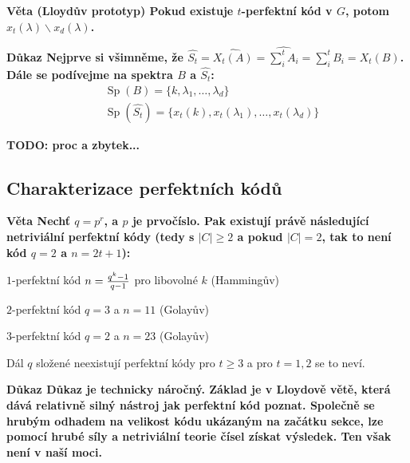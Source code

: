 \documentclass[a4paper,12pt,titlepage]{article}
\newcommand{\dk}{\smallskip\noindent\bf Důkaz\rm{} }
\newcommand{\vt}{\smallskip\noindent\bf Věta\rm{} }
\newcommand{\todo}[1]{\bf TODO: \rm#1}
\DeclareMathOperator{\Sp}{Sp}
\begin{document}
\vt (Lloydův prototyp) Pokud existuje $t$-perfektní kód v $G$, potom $x_t(\lambda)\backslash x_d(\lambda)$.

\dk Nejprve si všimněme, že $\widehat{S_t} = \widehat{X_t(A)} = \widehat{\sum_i^t A_i} = \sum_i^t B_i = X_t(B)$.
Dále se podívejme na spektra $B$ a $\widehat{S_t}$:
\begin{align}
	&\Sp(B) = \{ k, \lambda_1, \ldots, \lambda_d \} \\
	&\Sp(\widehat{S_t}) = \{ x_t(k), x_t(\lambda_1), \ldots, x_t(\lambda_d) \}
\end{align}

\todo{proc a zbytek...}


\subsection{Charakterizace perfektních kódů}

\vt Nechť $q=p^r$, a $p$ je prvočíslo. Pak existují právě následující netriviální perfektní kódy (tedy s $|C| \geq 2$ a pokud $|C| = 2$, tak to není kód $q=2$ a $n=2t+1$):
\begin{description}
	\item $1$-perfektní kód $n={q^k-1 \over q-1}$ pro libovolné $k$ (Hammingův)
	\item $2$-perfektní kód $q=3$ a $n=11$ (Golayův)
	\item $3$-perfektní kód $q=2$ a $n=23$ (Golayův)
\end{description}
Dál $q$ složené neexistují perfektní kódy pro $t \geq 3$ a pro $t = 1,2$ se to neví.

\dk Důkaz je technicky náročný. Základ je v Lloydově větě, která dává relativně silný nástroj jak perfektní kód poznat. Společně se hrubým odhadem na velikost kódu ukázaným na začátku sekce, lze pomocí hrubé síly a netriviální teorie čísel získat výsledek. Ten však není v naší moci.
\end{document}
